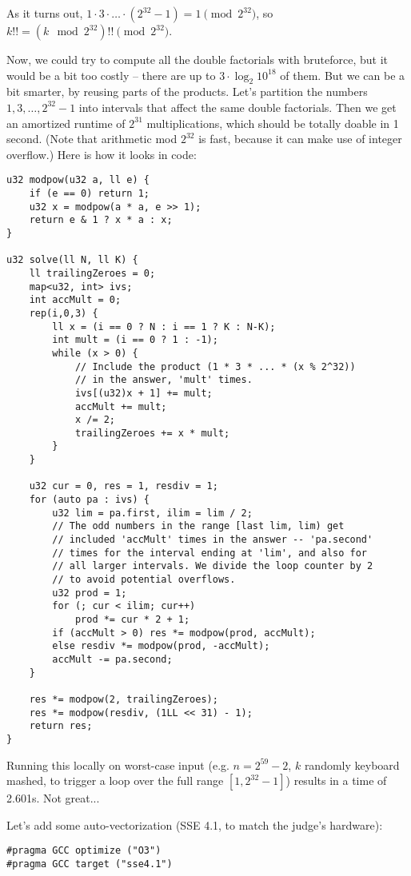 As it turns out, $1 \cdot 3 \cdot \ldots \cdot (2^{32}-1) = 1 \pmod{2^{32}}$, so $k!! = (k \mod 2^{32})!! \pmod{2^{32}}$.

Now, we could try to compute all the double factorials with bruteforce, but it would be a bit too costly -- there are up to $3 \cdot \log_2{10^{18}}$ of them.
But we can be a bit smarter, by reusing parts of the products.
Let's partition the numbers $1, 3, \dots, 2^{32}-1$ into intervals that affect the same double factorials.
Then we get an amortized runtime of $2^{31}$ multiplications, which should be totally doable in 1 second.
(Note that arithmetic mod $2^{32}$ is fast, because it can make use of integer overflow.)
Here is how it looks in code:

\begin{lstlisting}
u32 modpow(u32 a, ll e) {
	if (e == 0) return 1;
	u32 x = modpow(a * a, e >> 1);
	return e & 1 ? x * a : x;
}

u32 solve(ll N, ll K) {
	ll trailingZeroes = 0;
	map<u32, int> ivs;
	int accMult = 0;
	rep(i,0,3) {
		ll x = (i == 0 ? N : i == 1 ? K : N-K);
		int mult = (i == 0 ? 1 : -1);
		while (x > 0) {
			// Include the product (1 * 3 * ... * (x % 2^32))
			// in the answer, 'mult' times.
			ivs[(u32)x + 1] += mult;
			accMult += mult;
			x /= 2;
			trailingZeroes += x * mult;
		}
	}

	u32 cur = 0, res = 1, resdiv = 1;
	for (auto pa : ivs) {
		u32 lim = pa.first, ilim = lim / 2;
		// The odd numbers in the range [last lim, lim) get
		// included 'accMult' times in the answer -- 'pa.second'
		// times for the interval ending at 'lim', and also for
		// all larger intervals. We divide the loop counter by 2
		// to avoid potential overflows.
		u32 prod = 1;
		for (; cur < ilim; cur++)
			prod *= cur * 2 + 1;
		if (accMult > 0) res *= modpow(prod, accMult);
		else resdiv *= modpow(prod, -accMult);
		accMult -= pa.second;
	}

	res *= modpow(2, trailingZeroes);
	res *= modpow(resdiv, (1LL << 31) - 1);
	return res;
}
\end{lstlisting}

Running this locally on worst-case input (e.g. $n = 2^{59}-2$, $k$ randomly keyboard mashed, to trigger a loop over the full range $[1, 2^{32}-1]$) results in a time of 2.601s. Not great...

Let's add some auto-vectorization (SSE 4.1, to match the judge's hardware):
\begin{lstlisting}
#pragma GCC optimize ("O3")
#pragma GCC target ("sse4.1")
\end{lstlisting}

